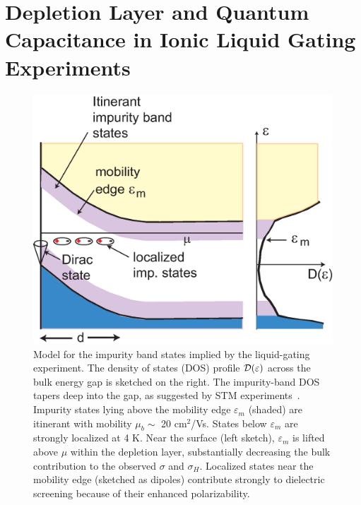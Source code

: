 \chapter{Depletion Layer and Quantum Capacitance in Ionic Liquid Gating Experiments\label{ch:Depletion}}

\begin{figure}[!htbp]
  \begin{center}
\includegraphics[width=0.65\linewidth]{ch-appendicies/figures/FigImpurityBand.eps}
\caption{\label{figimp}
Model for the impurity band states implied by the liquid-gating experiment. The density of states (DOS)
profile ${\cal D}(\varepsilon)$ across the bulk energy gap is sketched on the right. The impurity-band DOS tapers deep
into the gap, as suggested by STM experiments~\cite{Beidenkopf2011}. Impurity states lying above the mobility edge $\varepsilon_m$ (shaded)
are itinerant with mobility $\mu_b\sim$ 20 cm$^2$/Vs. States below $\varepsilon_m$ are strongly localized at 4 K. 
Near the surface (left sketch), $\varepsilon_m$ is lifted above 
$\mu$ within the depletion layer, substantially decreasing the bulk contribution to the observed $\sigma$ and $\sigma_H$. 
Localized states near the mobility edge (sketched as dipoles) contribute strongly to dielectric screening because of their 
enhanced polarizability.
}
  \end{center}
\end{figure} 


